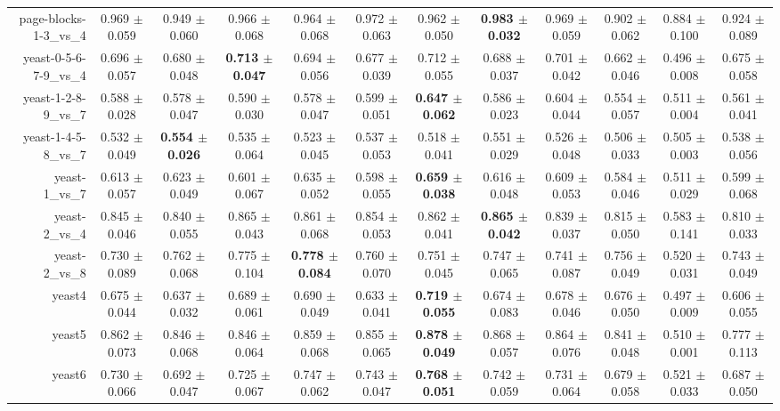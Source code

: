\begin{table}[!ht]
{\begin{tabular}{r c c c c c c c c c c c}
page-blocks-1-3\_vs\_4 & 0.969 $\pm$ 0.059 & 0.949 $\pm$ 0.060 & 0.966 $\pm$ 0.068 & 0.964 $\pm$ 0.068 & 0.972 $\pm$ 0.063 & 0.962 $\pm$ 0.050 & \textbf{0.983 $\pm$ 0.032} & 0.969 $\pm$ 0.059 & 0.902 $\pm$ 0.062 & 0.884 $\pm$ 0.100 & 0.924 $\pm$ 0.089 \\
yeast-0-5-6-7-9\_vs\_4 & 0.696 $\pm$ 0.057 & 0.680 $\pm$ 0.048 & \textbf{0.713 $\pm$ 0.047} & 0.694 $\pm$ 0.056 & 0.677 $\pm$ 0.039 & 0.712 $\pm$ 0.055 & 0.688 $\pm$ 0.037 & 0.701 $\pm$ 0.042 & 0.662 $\pm$ 0.046 & 0.496 $\pm$ 0.008 & 0.675 $\pm$ 0.058 \\
yeast-1-2-8-9\_vs\_7 & 0.588 $\pm$ 0.028 & 0.578 $\pm$ 0.047 & 0.590 $\pm$ 0.030 & 0.578 $\pm$ 0.047 & 0.599 $\pm$ 0.051 & \textbf{0.647 $\pm$ 0.062} & 0.586 $\pm$ 0.023 & 0.604 $\pm$ 0.044 & 0.554 $\pm$ 0.057 & 0.511 $\pm$ 0.004 & 0.561 $\pm$ 0.041 \\
yeast-1-4-5-8\_vs\_7 & 0.532 $\pm$ 0.049 & \textbf{0.554 $\pm$ 0.026} & 0.535 $\pm$ 0.064 & 0.523 $\pm$ 0.045 & 0.537 $\pm$ 0.053 & 0.518 $\pm$ 0.041 & 0.551 $\pm$ 0.029 & 0.526 $\pm$ 0.048 & 0.506 $\pm$ 0.033 & 0.505 $\pm$ 0.003 & 0.538 $\pm$ 0.056 \\
yeast-1\_vs\_7 & 0.613 $\pm$ 0.057 & 0.623 $\pm$ 0.049 & 0.601 $\pm$ 0.067 & 0.635 $\pm$ 0.052 & 0.598 $\pm$ 0.055 & \textbf{0.659 $\pm$ 0.038} & 0.616 $\pm$ 0.048 & 0.609 $\pm$ 0.053 & 0.584 $\pm$ 0.046 & 0.511 $\pm$ 0.029 & 0.599 $\pm$ 0.068 \\
yeast-2\_vs\_4 & 0.845 $\pm$ 0.046 & 0.840 $\pm$ 0.055 & 0.865 $\pm$ 0.043 & 0.861 $\pm$ 0.068 & 0.854 $\pm$ 0.053 & 0.862 $\pm$ 0.041 & \textbf{0.865 $\pm$ 0.042} & 0.839 $\pm$ 0.037 & 0.815 $\pm$ 0.050 & 0.583 $\pm$ 0.141 & 0.810 $\pm$ 0.033 \\
yeast-2\_vs\_8 & 0.730 $\pm$ 0.089 & 0.762 $\pm$ 0.068 & 0.775 $\pm$ 0.104 & \textbf{0.778 $\pm$ 0.084} & 0.760 $\pm$ 0.070 & 0.751 $\pm$ 0.045 & 0.747 $\pm$ 0.065 & 0.741 $\pm$ 0.087 & 0.756 $\pm$ 0.049 & 0.520 $\pm$ 0.031 & 0.743 $\pm$ 0.049 \\
yeast4 & 0.675 $\pm$ 0.044 & 0.637 $\pm$ 0.032 & 0.689 $\pm$ 0.061 & 0.690 $\pm$ 0.049 & 0.633 $\pm$ 0.041 & \textbf{0.719 $\pm$ 0.055} & 0.674 $\pm$ 0.083 & 0.678 $\pm$ 0.046 & 0.676 $\pm$ 0.050 & 0.497 $\pm$ 0.009 & 0.606 $\pm$ 0.055 \\
yeast5 & 0.862 $\pm$ 0.073 & 0.846 $\pm$ 0.068 & 0.846 $\pm$ 0.064 & 0.859 $\pm$ 0.068 & 0.855 $\pm$ 0.065 & \textbf{0.878 $\pm$ 0.049} & 0.868 $\pm$ 0.057 & 0.864 $\pm$ 0.076 & 0.841 $\pm$ 0.048 & 0.510 $\pm$ 0.001 & 0.777 $\pm$ 0.113 \\
yeast6 & 0.730 $\pm$ 0.066 & 0.692 $\pm$ 0.047 & 0.725 $\pm$ 0.067 & 0.747 $\pm$ 0.062 & 0.743 $\pm$ 0.047 & \textbf{0.768 $\pm$ 0.051} & 0.742 $\pm$ 0.059 & 0.731 $\pm$ 0.064 & 0.679 $\pm$ 0.058 & 0.521 $\pm$ 0.033 & 0.687 $\pm$ 0.050 \\

\end{tabular}}
\end{table}
